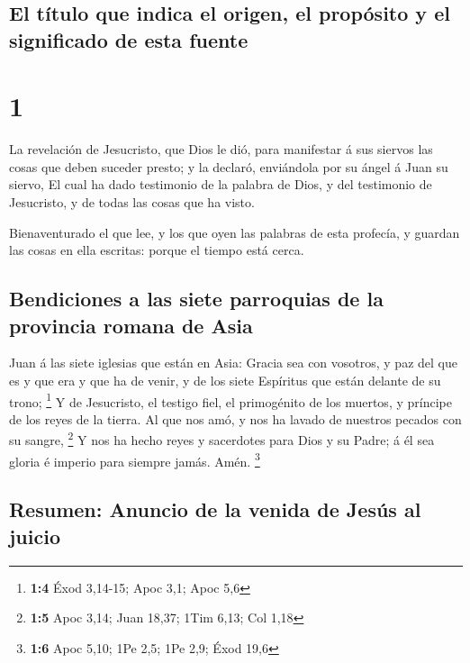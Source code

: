 \hypertarget{el-tuxedtulo-que-indica-el-origen-el-propuxf3sito-y-el-significado-de-esta-fuente}{%
\subsection{El título que indica el origen, el propósito y el
significado de esta
fuente}\label{el-tuxedtulo-que-indica-el-origen-el-propuxf3sito-y-el-significado-de-esta-fuente}}

\hypertarget{section}{%
\section{1}\label{section}}

 La revelación de Jesucristo, que Dios le dió, para
manifestar á sus siervos las cosas que deben suceder presto; y la
declaró, enviándola por su ángel á Juan su siervo,  El
cual ha dado testimonio de la palabra de Dios, y del testimonio de
Jesucristo, y de todas las cosas que ha visto.

 Bienaventurado el que lee, y los que oyen las palabras de
esta profecía, y guardan las cosas en ella escritas: porque el tiempo
está cerca.

\hypertarget{bendiciones-a-las-siete-parroquias-de-la-provincia-romana-de-asia}{%
\subsection{Bendiciones a las siete parroquias de la provincia romana de
Asia}\label{bendiciones-a-las-siete-parroquias-de-la-provincia-romana-de-asia}}

 Juan á las siete iglesias que están en Asia: Gracia sea
con vosotros, y paz del que es y que era y que ha de venir, y de los
siete Espíritus que están delante de su trono; \footnote{\textbf{1:4}
  Éxod 3,14-15; Apoc 3,1; Apoc 5,6}  Y de Jesucristo, el
testigo fiel, el primogénito de los muertos, y príncipe de los reyes de
la tierra. Al que nos amó, y nos ha lavado de nuestros pecados con su
sangre, \footnote{\textbf{1:5} Apoc 3,14; Juan 18,37; 1Tim 6,13; Col
  1,18}  Y nos ha hecho reyes y sacerdotes para Dios y su
Padre; á él sea gloria é imperio para siempre jamás. Amén. \footnote{\textbf{1:6}
  Apoc 5,10; 1Pe 2,5; 1Pe 2,9; Éxod 19,6}

\hypertarget{resumen-anuncio-de-la-venida-de-jesuxfas-al-juicio}{%
\subsection{Resumen: Anuncio de la venida de Jesús al
juicio}\label{resumen-anuncio-de-la-venida-de-jesuxfas-al-juicio}}

